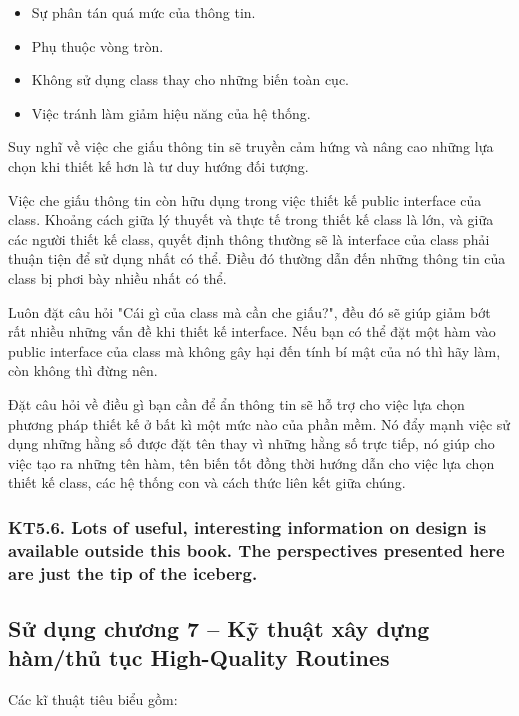 \documentclass[12pt]{report}
\begin{document}
\begin{itemize}
	\item Sự phân tán quá mức của thông tin. 
	\item Phụ thuộc vòng tròn. 
	\item Không sử dụng class thay cho những biến toàn cục. 
	\item Việc tránh làm giảm hiệu năng của hệ thống. 
\end{itemize}
\vspace*{3mm}

Suy nghĩ về việc che giấu thông tin sẽ truyền cảm hứng và nâng cao những lựa chọn khi thiết kế hơn là tư duy hướng đối tượng. 

Việc che giấu thông tin còn hữu dụng trong việc thiết kế public interface của class. Khoảng cách giữa lý thuyết và thực tế trong thiết kế class là lớn, và giữa các người thiết kế class, quyết định thông thường sẽ là interface của class phải thuận tiện để sử dụng nhất có thể. Điều đó thường dẫn đến những thông tin của class bị phơi bày nhiều nhất có thể. 

Luôn đặt câu hỏi "Cái gì của class mà cần che giấu?", đều đó sẽ giúp giảm bớt rất nhiều những vấn đề khi thiết kế interface. Nếu bạn có thể đặt một hàm vào public interface của class mà không gây hại đến tính bí mật của nó thì hãy làm, còn không thì đừng nên. 

Đặt câu hỏi về điều gì bạn cần để ẩn thông tin sẽ hỗ trợ cho việc lựa chọn phương pháp thiết kế ở bất kì một mức nào của phần mềm. Nó đẩy mạnh việc sử dụng những hằng số được đặt tên thay vì những hằng số trực tiếp, nó giúp cho việc tạo ra những tên hàm, tên biến tốt đồng thời hướng dẫn cho việc lựa chọn thiết kế class, các hệ thống con và cách thức liên kết giữa chúng. 

\subsubsection{KT5.6. Lots of useful, interesting information on design is available outside this book. The perspectives presented here are just the tip of the iceberg.}


\subsection{Sử dụng chương 7 -- Kỹ thuật xây dựng hàm/thủ tục High-Quality Routines}
\noindent Các kĩ thuật tiêu biểu gồm:
\end{document}
